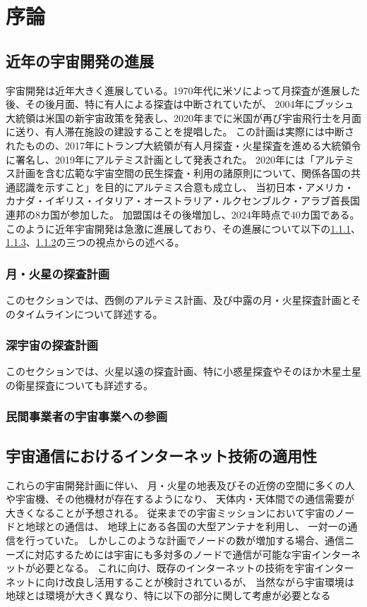 \chapter{序論}
\section{近年の宇宙開発の進展}
宇宙開発は近年大きく進展している。1970年代に米ソによって月探査が進展した後、その後月面、特に有人による探査は中断されていたが、
2004年にブッシュ大統領は米国の新宇宙政策を発表し、2020年までに米国が再び宇宙飛行士を月面に送り、有人滞在施設の建設することを提唱した。\cite{久保田2009}
この計画は実際には中断されたものの、2017年にトランプ大統領が有人月探査・火星探査を進める大統領令に署名し、2019年にアルテミス計画として発表された。\cite{nasa2020}
2020年には「アルテミス計画を含む広範な宇宙空間の民生探査・利用の諸原則について、関係各国の共通認識を示すこと」を目的にアルテミス合意\cite{artemis_agreement1}も成立し、
当初日本・アメリカ・カナダ・イギリス・イタリア・オーストラリア・ルクセンブルク・アラブ首長国連邦の8カ国が参加した。\cite{artemis_agreement2}
加盟国はその後増加し、2024年時点で40カ国である。\cite{artemis_agreement3}
このように近年宇宙開発は急激に進展しており、その進展について以下の\ref{月・火星の探査計画}、
\ref{民間事業者の宇宙事業への参画}、\ref{深宇宙の探査計画}の三つの視点からの述べる。
\subsection{月・火星の探査計画}
\label{月・火星の探査計画}
このセクションでは、西側のアルテミス計画、及び中露の月・火星探査計画とそのタイムラインについて詳述する。
\subsection{深宇宙の探査計画}
\label{深宇宙の探査計画}
このセクションでは、火星以遠の探査計画、特に小惑星探査やそのほか木星土星の衛星探査についても詳述する。

\subsection{民間事業者の宇宙事業への参画}
\label{民間事業者の宇宙事業への参画}

\section{宇宙通信におけるインターネット技術の適用性}
これらの宇宙開発計画に伴い、 月・火星の地表及びその近傍の空間に多くの人や宇宙機、その他機材が存在するようになり、
天体内・天体間での通信需要が大きくなることが予想される。 
従来までの宇宙ミッションにおいて宇宙のノードと地球との通信は、 地球上にある各国の大型アンテナを利用し、 一対一の通信を行っていた。
しかしこのような計画でノードの数が増加する場合、通信ニーズに対応するためには宇宙にも多対多のノードで通信が可能な宇宙インターネットが必要となる。 
これに向け、既存のインターネットの技術を宇宙インターネットに向け改良し活用することが検討されているが、
当然ながら宇宙環境は地球とは環境が大きく異なり、特に以下の部分に関して考慮が必要となる

